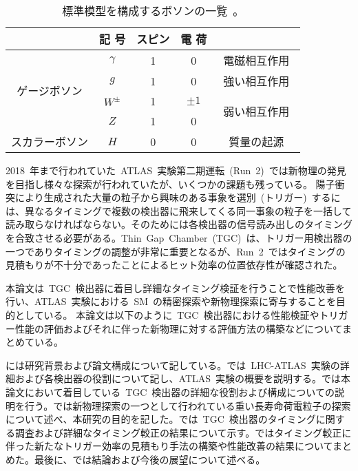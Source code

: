 \begin{table}[htbp]
	\centering
	\begin{tabular}{c|c|c|c|c}\hline
	&記 号& スピン & 電 荷 &\\ \hline\hline
	\multirow{4}{*}{ゲージボソン} & $\gamma$ & 1 & 0 & 電磁相互作用　\\
	 & $g$ & 1 & 0 & 強い相互作用　\\
	 & $W^{\pm}$ & 1 & $\pm1$ & \multirow{2}{*}{弱い相互作用}　\\
	 & $Z$ & 1 & 0 &  \\ \hline
	スカラーボソン & $H$ & 0 & 0 & 質量の起源 \\ \hline
	\end{tabular}
	\caption[標準模型を構成するボソンの一覧]{標準模型を構成するボソンの一覧~\cite{URL:10}。}
	\label{tb:SM2}
\end{table}

2018~年まで行われていた~ATLAS~実験第二期運転~(Run~2)~では新物理の発見を目指し様々な探索が行われていたが、いくつかの課題も残っている。
陽子衝突により生成された大量の粒子から興味のある事象を選別~(トリガー)~するには、異なるタイミングで複数の検出器に飛来してくる同一事象の粒子を一括して読み取らなければならない。そのためには各検出器の信号読み出しのタイミングを合致させる必要がある。Thin~Gap~Chamber~(TGC)~\cite{TR:04}は、トリガー用検出器の一つでありタイミングの調整が非常に重要となるが、Run~2~ではタイミングの見積もりが不十分であったことによるヒット効率の位置依存性が確認された。

本論文は~TGC~検出器に着目し詳細なタイミング検証を行うことで性能改善を行い、ATLAS~実験における~SM~の精密探索や新物理探索に寄与することを目的としている。
本論文は以下のように~TGC~検出器における性能検証やトリガー性能の評価およびそれに伴った新物理に対する評価方法の構築などについてまとめている。

には研究背景および論文構成について記している。では~LHC-ATLAS~実験の詳細および各検出器の役割について記し、ATLAS~実験の概要を説明する。では本論文において着目している~TGC~検出器の詳細な役割および構成についての説明を行う。では新物理探索の一つとして行われている重い長寿命荷電粒子の探索について述べ、本研究の目的を記した。では~TGC~検出器のタイミングに関する調査および詳細なタイミング較正の結果について示す。ではタイミング較正に伴った新たなトリガー効率の見積もり手法の構築や性能改善の結果についてまとめた。最後に、では結論および今後の展望について述べる。